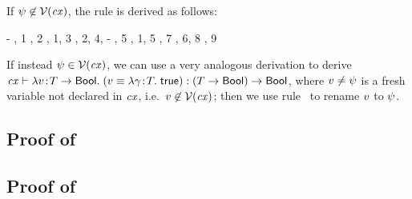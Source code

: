If $\psi\not\in\mathcal{V}(\mathit{cx})$, the rule is derived as follows:
\begin{derivation}
\step{\istyO{\typ}}
     {\hyp}
\step{\cxwfO}
     {, 1}
\step{\istyO{\bool}}
     {\Rtbool, 2}
\step{\istyO{\tarr{\typ}{\bool}}}
     {\Rtarr, 1, 3}
\step{\cxwf{\snoc{\cx}{\vdec{\varfxpred}{\tarr{\typ}{\bool}}}}}
     {\Rcxvdec, 2, 4, \hyp}
\step{\hasty{\snoc{\cx}{\vdec{\varfxpred}{\tarr{\typ}{\bool}}}}
            {\varfxpred}{\tarr{\typ}{\bool}}}
     {\Revar, 5}
\step{\isty{\snoc{\cx}{\vdec{\varfxpred}{\tarr{\typ}{\bool}}}}{\typ}}
     {, 1, 5}
\step{\hasty{\snoc{\cx}{\vdec{\varfxpred}{\tarr{\typ}{\bool}}}}
            {\abs{\varfx}{\typ}{\true}}{\tarr{\typ}{\bool}}}
     {\Reconsttrue, 7}
\step{\hasty{\snoc{\cx}{\vdec{\varfxpred}{\tarr{\typ}{\bool}}}}
            {\eq{\varfxpred}{\abs{\varfx}{\typ}{\true}}}{\bool}}
     {\Reeq, 6, 8}
\step{\hastyO{\abs{\varfxpred}
                  {\tarr{\typ}{\bool}}
                  {(\eq{\varfxpred}{\abs{\varfx}{\typ}{\true}})}}
             {\tarr{(\tarr{\typ}{\bool})}{\bool}}}
     {\Reabs, 9}
\end{derivation}
If instead $\psi\in\mathcal{V}(\mathit{cx})$, we can use a very analogous derivation to
derive
$\mathit{cx}\vdash\lambda v\!:\!T\to\mathsf{Bool}.\;(v\equiv\lambda\gamma\!:\!T.\;\mathsf{true}):(T\to\mathsf{Bool})\to\mathsf{Bool}$, where $v\neq\psi$ is a fresh
variable not declared in $\mathit{cx}$, i.e.\ $v\not\in\mathcal{V}(\mathit{cx})$; then we use rule
\Reabsalpha\ to rename $v$ to $\psi$.



\subsection*{Proof of }

\begin{derivation}
\step{\hasty{\snoc{\cx}{\vdecO}}{\expr}{\bool}}{\hyp}
\end{derivation}



\subsection*{Proof of }

